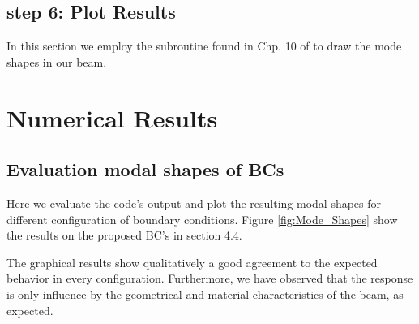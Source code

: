 \documentclass[10pt,twoside,a4paper]{article}
\begin{document}
\subsection{step 6: Plot Results}
In this section we employ the subroutine found in Chp. 10 of \cite{ferreira2007} to draw the mode shapes in our beam.



\section{Numerical Results}

\subsection{Evaluation modal shapes of BCs}
Here we evaluate the code's output and plot the resulting modal shapes for different configuration of boundary conditions. Figure \ref{fig:Mode_Shapes} show the results on the proposed BC's in section 4.4. 

The graphical results show qualitatively a good agreement to the expected behavior in every configuration. Furthermore, we have observed that the response is only influence by the geometrical and material characteristics of the beam, as expected.
\end{document}
